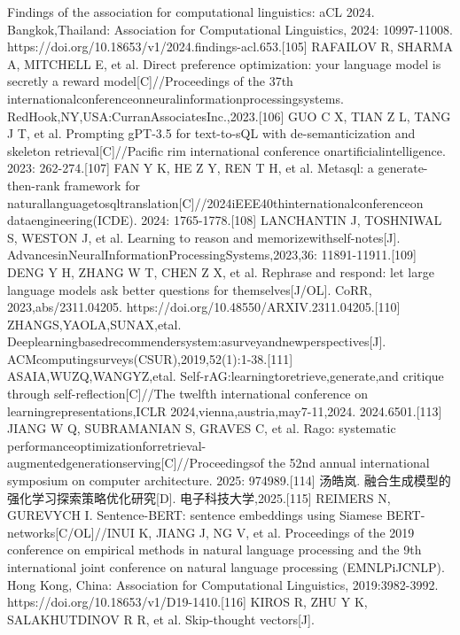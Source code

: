 \documentclass[12pt,a4paper,openright,UTF8]{ctexbook}
\begin{document}
Findings of the association for computational linguistics: aCL 2024. Bangkok,Thailand: Association for Computational Linguistics, 2024: 10997-11008. https://doi.org/10.18653/v1/2024.findings-acl.653.[105] RAFAILOV R, SHARMA A, MITCHELL E, et al. Direct preference optimization: your language model is secretly a reward model[C]//Proceedings of the 37th internationalconferenceonneuralinformationprocessingsystems. RedHook,NY,USA:CurranAssociatesInc.,2023.[106] GUO C X, TIAN Z L, TANG J T, et al. Prompting gPT-3.5 for text-to-sQL with de-semanticization and skeleton retrieval[C]//Pacific rim international conference onartificialintelligence. 2023: 262-274.[107] FAN Y K, HE Z Y, REN T H, et al. Metasql: a generate-then-rank framework for naturallanguagetosqltranslation[C]//2024iEEE40thinternationalconferenceon dataengineering(ICDE). 2024: 1765-1778.[108] LANCHANTIN J, TOSHNIWAL S, WESTON J, et al. Learning to reason and memorizewithself-notes[J]. AdvancesinNeuralInformationProcessingSystems,2023,36: 11891-11911.[109] DENG Y H, ZHANG W T, CHEN Z X, et al. Rephrase and respond: let large language models ask better questions for themselves[J/OL]. CoRR, 2023,abs/2311.04205. https://doi.org/10.48550/ARXIV.2311.04205.[110] ZHANGS,YAOLA,SUNAX,etal. Deeplearningbasedrecommendersystem:asurveyandnewperspectives[J]. ACMcomputingsurveys(CSUR),2019,52(1):1-38.[111] ASAIA,WUZQ,WANGYZ,etal. Self-rAG:learningtoretrieve,generate,and critique through self-reflection[C]//The twelfth international conference on learningrepresentations,ICLR 2024,vienna,austria,may7-11,2024. 2024.6501.[113] JIANG W Q, SUBRAMANIAN S, GRAVES C, et al. Rago: systematic performanceoptimizationforretrieval-augmentedgenerationserving[C]//Proceedingsof the 52nd annual international symposium on computer architecture. 2025: 974989.[114] 汤皓岚. 融合生成模型的强化学习探索策略优化研究[D]. 电子科技大学,2025.[115] REIMERS N, GUREVYCH I. Sentence-BERT: sentence embeddings using Siamese BERT-networks[C/OL]//INUI K, JIANG J, NG V, et al. Proceedings of the 2019 conference on empirical methods in natural language processing and the 9th international joint conference on natural language processing (EMNLPiJCNLP). Hong Kong, China: Association for Computational Linguistics, 2019:3982-3992. https://doi.org/10.18653/v1/D19-1410.[116] KIROS R, ZHU Y K, SALAKHUTDINOV R R, et al. Skip-thought vectors[J].
\end{document}
